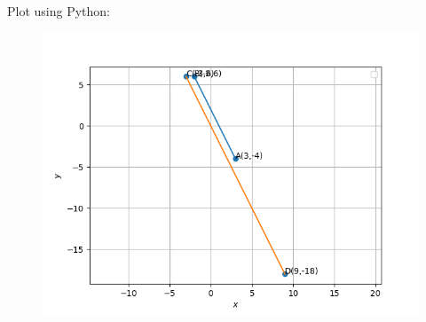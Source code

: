 \documentclass[journal,12pt,onecolumn]{IEEEtran}
\begin{document}
Plot using Python:
\begin{figure}[H]
	\centering
	\includegraphics[scale=0.5]{img}
	\caption*{}
	\label{img2}
\end{figure}
\end{document}
